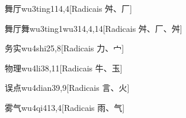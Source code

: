 \begin{entry}{舞厅}{wu3ting1}{14,4}[Radicais ⾇、⼚]
\end{entry}

\begin{entry}{舞厅舞}{wu3ting1wu3}{14,4,14}[Radicais ⾇、⼚、⾇]
\end{entry}

\begin{entry}{务实}{wu4shi2}{5,8}[Radicais ⼒、⼧]
\end{entry}

\begin{entry}{物理}{wu4li3}{8,11}[Radicais ⽜、⽟]
\end{entry}

\begin{entry}{误点}{wu4dian3}{9,9}[Radicais ⾔、⽕]
\end{entry}

\begin{entry}{雾气}{wu4qi4}{13,4}[Radicais ⾬、⽓]
\end{entry}



